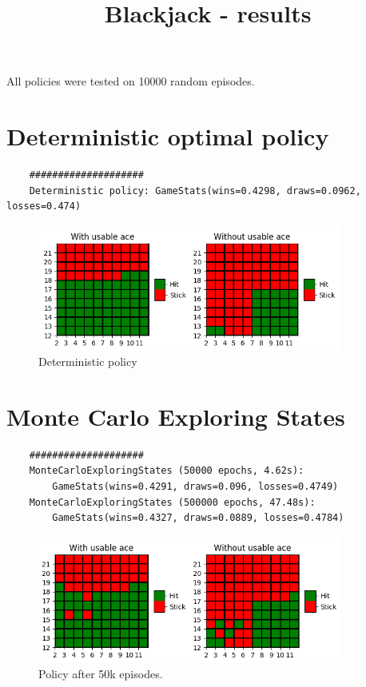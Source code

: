 \documentclass{article}
\title{Blackjack - results}
\date{}
\begin{document}
\maketitle

All policies were tested on 10000 random episodes.

\section{Deterministic optimal policy}
\begin{verbatim}
    ####################
    Deterministic policy: GameStats(wins=0.4298, draws=0.0962, losses=0.474)
\end{verbatim}
\begin{figure}[h]
    \centering
    \includegraphics[width=10cm]{plots/deterministic_policy.png}
    \caption{Deterministic policy}
\end{figure}


\section{Monte Carlo Exploring States}
\begin{verbatim}
    ####################
    MonteCarloExploringStates (50000 epochs, 4.62s):
        GameStats(wins=0.4291, draws=0.096, losses=0.4749)
    MonteCarloExploringStates (500000 epochs, 47.48s):
        GameStats(wins=0.4327, draws=0.0889, losses=0.4784)
\end{verbatim}

\begin{figure}[h]
    \centering
    \includegraphics[width=10cm]{plots/mces_policy_50k.png}
    \caption{Policy after 50k episodes.}
\end{figure}
\end{document}
